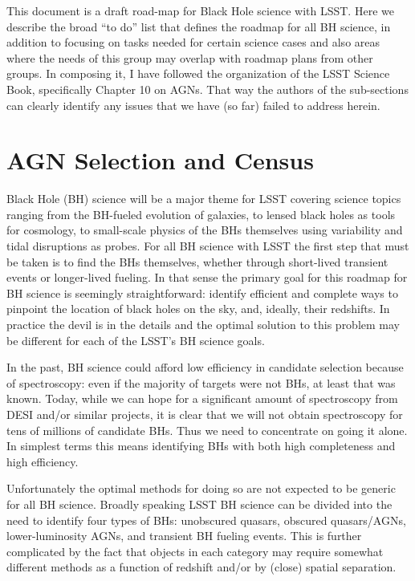 This document is a draft road-map for Black Hole science with LSST.  Here we describe the broad ``to do'' list that defines the roadmap for all BH science, in addition to focusing on tasks needed for certain science cases and also areas where the needs of this group may overlap with roadmap plans from other groups.  In composing it, I have followed the organization of the LSST Science Book, specifically Chapter 10 on AGNs.  That way the authors of the sub-sections can clearly identify any issues that we have (so far) failed to address herein.

\section{AGN Selection and Census}

Black Hole (BH) science will be a major theme for LSST covering science topics ranging from the BH-fueled evolution of galaxies, to lensed black holes as tools for cosmology, to small-scale physics of the BHs themselves using variability and tidal disruptions as probes.  For all BH science with LSST the first step that must be taken is to find the BHs themselves, whether through short-lived transient events or longer-lived fueling.  In that sense the primary goal for this roadmap for BH science is seemingly straightforward: identify efficient and complete ways to pinpoint the location of black holes on the sky, and, ideally, their redshifts.  In practice the devil is in the details and the optimal solution to this problem may be different for each of the LSST's BH science goals.

In the past, BH science could afford low efficiency in candidate
selection because of spectroscopy: even if the majority of targets
were not BHs, at least that was known.  Today, while we can hope for a
significant amount of spectroscopy from DESI and/or similar projects,
it is clear that we will not obtain spectroscopy for tens of millions
of candidate BHs.  Thus we need to concentrate on going it alone. In
simplest terms this means identifying BHs with both high completeness
and high efficiency.

Unfortunately the optimal methods for doing so are not expected to be
generic for all BH science.  Broadly speaking LSST BH science can be
divided into the need to identify four types of BHs: unobscured
quasars, obscured quasars/AGNs, lower-luminosity AGNs, and transient BH
fueling events.  This is further complicated by the fact that objects
in each category may require somewhat different methods as a function
of redshift and/or by (close) spatial separation.

